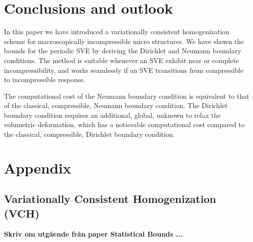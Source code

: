\documentclass[12pt,a4paper]{article}
\begin{document}


\section{Conclusions and outlook}
In this paper we have introduced a variationally consistent homogenization scheme for macroscopically incompressible micro structures.
We have shown the bounds for the periodic SVE by deriving the Dirichlet and Neumann boundary conditions.
The method is suitable whenever an SVE exhibit near or complete incompressibility, and works seamlessly if an SVE transitions from compressible to incompressible response.

The computational cost of the Neumann boundary condition is equivalent to that of the classical, compressible, Neumann boundary condition.
The Dirichlet boundary condition requires an additional, global, unknown to relax the volumetric deformation, which has a noticeable computational cost compared to the classical, compressible, Dirichlet boundary condition.




%
%
%

%

\appendix
\setcounter{equation}{0}
\renewcommand{\theequation}{A-\arabic{equation}}

\section{Appendix}

\subsection{Variationally Consistent Homogenization (VCH)}
\label{appendix:1}

\textbf{Skriv om utg\aa{}ende fr\aa{}n paper Statistical Bounds ...}
\end{document}
